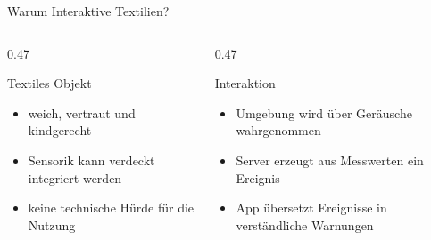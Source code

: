 \documentclass[aspectratio=169,11pt]{beamer}
\begin{document}
\begin{frame}{Warum Interaktive Textilien?}
  \begin{columns}[T,totalwidth=\textwidth]
    \begin{column}{0.47\textwidth}
      \begin{block}{Textiles Objekt}
        \begin{itemize}
          \item weich, vertraut und kindgerecht
          \item Sensorik kann verdeckt integriert werden
          \item keine technische Hürde für die Nutzung
        \end{itemize}
      \end{block}
    \end{column}
    \begin{column}{0.47\textwidth}
      \begin{block}{Interaktion}
        \begin{itemize}
          \item Umgebung wird über Geräusche wahrgenommen
          \item Server erzeugt aus Messwerten ein Ereignis
          \item App übersetzt Ereignisse in verständliche Warnungen
        \end{itemize}
      \end{block}
    \end{column}
  \end{columns}

  \vspace{0.8em}
  \begin{center}
  \end{center}
\end{frame}
\end{document}
